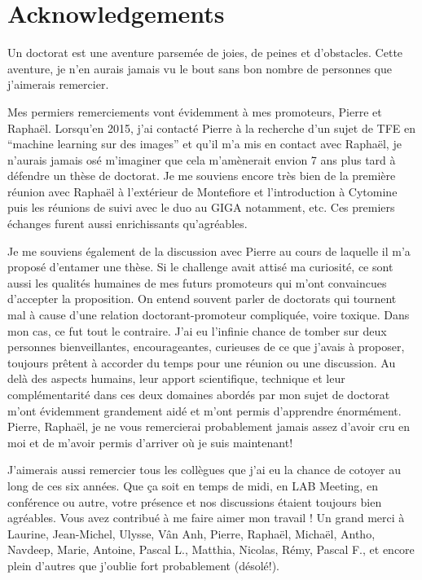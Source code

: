 \chapter*{Acknowledgements}

Un doctorat est une aventure parsemée de joies, de peines et d'obstacles. Cette aventure, je n'en aurais jamais vu le bout sans bon nombre de personnes que j'aimerais remercier. 

\vspace{15pt}

Mes permiers remerciements vont évidemment à mes promoteurs, Pierre et Raphaël. Lorsqu'en 2015, j'ai contacté Pierre à la recherche d'un sujet de TFE en ``machine learning sur des images'' et qu'il m'a mis en contact avec Raphaël, je n'aurais jamais osé m'imaginer que cela m'amènerait envion 7 ans plus tard à défendre un thèse de doctorat. Je me souviens encore très bien de la première réunion avec Raphaël à l'extérieur de Montefiore et l'introduction à Cytomine puis les réunions de suivi avec le duo au GIGA notamment, etc. Ces premiers échanges furent aussi enrichissants qu'agréables.

Je me souviens également de la discussion avec Pierre au cours de laquelle il m'a proposé d'entamer une thèse. Si le challenge avait attisé ma curiosité, ce sont aussi les qualités humaines de mes futurs promoteurs qui m'ont convaincues d'accepter la proposition. On entend souvent parler de doctorats qui tournent mal à cause d'une relation doctorant-promoteur compliquée, voire toxique. Dans mon cas, ce fut tout le contraire. J'ai eu l'infinie chance de tomber sur deux personnes bienveillantes, encourageantes, curieuses de ce que j'avais à proposer, toujours prêtent à accorder du temps pour une réunion ou une discussion. Au delà des aspects humains, leur apport scientifique, technique et leur complémentarité dans ces deux domaines abordés par mon sujet de doctorat m'ont évidemment grandement aidé et m'ont permis d'apprendre énormément. Pierre, Raphaël, je ne vous remercierai probablement jamais assez d'avoir cru en moi et de m'avoir permis d'arriver où je suis maintenant!

\vspace{15pt}

J'aimerais aussi remercier tous les collègues que j'ai eu la chance de cotoyer au long de ces six années. Que ça soit en temps de midi, en LAB Meeting, en conférence ou autre, votre présence et nos discussions étaient toujours bien agréables. Vous avez contribué à me faire aimer mon travail ! Un grand merci à Laurine, Jean-Michel, Ulysse, Vân Anh, Pierre, Raphaël, Michaël, Antho, Navdeep, Marie, Antoine, Pascal L., Matthia, Nicolas, Rémy, Pascal F., et encore plein d'autres que j'oublie fort probablement (désolé!).

